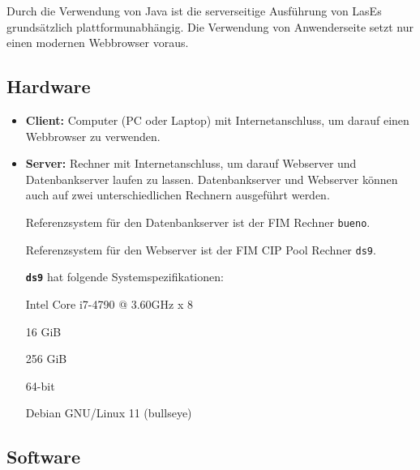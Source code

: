 
Durch die Verwendung von Java ist die serverseitige Ausführung von LasEs
grundsätzlich plattformunabhängig.
Die Verwendung von Anwenderseite setzt nur einen modernen Webbrowser voraus.

\subsection{Hardware}

\begin{itemize}
	\item \textbf{Client:} Computer (PC oder Laptop) mit Internetanschluss, um darauf einen Webbrowser zu verwenden.

	\item \textbf{Server:} Rechner mit Internetanschluss, um darauf Webserver und Datenbankserver laufen zu lassen. Datenbankserver und Webserver können auch auf zwei unterschiedlichen Rechnern ausgeführt werden.
	
	\label{dbspezi}
	Referenzsystem für den Datenbankserver ist der FIM Rechner \texttt{bueno}.
	
	\label{spezi}
	Referenzsystem für den Webserver ist der FIM CIP Pool Rechner \texttt{ds9}.

	\texttt{\textbf{ds9}} hat folgende Systemspezifikationen:

	\begin{itemize}
		 Intel Core i7-4790 @ 3.60GHz x 8

		 16 GiB

		 256 GiB

		 64-bit

		 Debian GNU/Linux 11 (bullseye)
	\end{itemize}


\end{itemize}

\subsection{Software}

